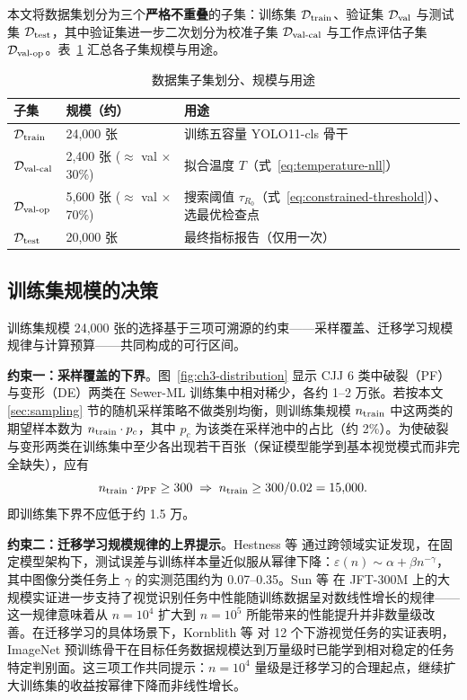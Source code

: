 \documentclass[UTF8,openany,12pt]{ctexbook}
\begin{document}
本文将数据集划分为三个\textbf{严格不重叠}的子集：训练集 $\mathcal{D}_{\rm train}$、验证集 $\mathcal{D}_{\rm val}$ 与测试集 $\mathcal{D}_{\rm test}$，其中验证集进一步二次划分为校准子集 $\mathcal{D}_{\rm val\text{-}cal}$ 与工作点评估子集 $\mathcal{D}_{\rm val\text{-}op}$。表~\ref{tab:dataset-sizes} 汇总各子集规模与用途。

\begin{table}[H]
    \centering
    \caption{数据集子集划分、规模与用途}
    \label{tab:dataset-sizes}
    \begin{tabularx}{\textwidth}{p{2.6cm}p{2.2cm}X}
        \toprule
        子集 & 规模（约） & 用途 \\
        \midrule
        $\mathcal{D}_{\rm train}$    & 24{,}000 张 & 训练五容量 YOLO11-cls 骨干 \\
        $\mathcal{D}_{\rm val\text{-}cal}$ & 2{,}400 张 ($\approx$ val $\times$ 30\%)  & 拟合温度 $T$（式~\eqref{eq:temperature-nll}）\\
        $\mathcal{D}_{\rm val\text{-}op}$  & 5{,}600 张 ($\approx$ val $\times$ 70\%)  & 搜索阈值 $\tau_{R_0}$（式~\eqref{eq:constrained-threshold}）、选最优检查点 \\
        $\mathcal{D}_{\rm test}$     & 20{,}000 张 & 最终指标报告（仅用一次） \\
        \bottomrule
    \end{tabularx}
\end{table}

\subsection{训练集规模的决策}
训练集规模 24{,}000 张的选择基于三项可溯源的约束——采样覆盖、迁移学习规模规律与计算预算——共同构成的可行区间。

\textbf{约束一：采样覆盖的下界}。图~\ref{fig:ch3-distribution} 显示 CJJ 6 类中破裂（PF）与变形（DE）两类在 Sewer-ML 训练集中相对稀少，各约 1--2 万张。若按本文 \ref{sec:sampling} 节的随机采样策略不做类别均衡，则训练集规模 $n_{\rm train}$ 中这两类的期望样本数为 $n_{\rm train} \cdot p_c$，其中 $p_c$ 为该类在采样池中的占比（约 2\%）。为使破裂与变形两类在训练集中至少各出现若干百张（保证模型能学到基本视觉模式而非完全缺失），应有
\begin{equation}
n_{\rm train} \cdot p_{\rm PF} \geq 300 \;\Rightarrow\; n_{\rm train} \geq 300 / 0.02 = 15{,}000.
\label{eq:train-lowerbound}
\end{equation}
即训练集下界不应低于约 1.5 万。

\textbf{约束二：迁移学习规模规律的上界提示}。Hestness 等\cite{hestness2017scaling} 通过跨领域实证发现，在固定模型架构下，测试误差与训练样本量近似服从幂律下降：$\varepsilon(n) \sim \alpha + \beta n^{-\gamma}$，其中图像分类任务上 $\gamma$ 的实测范围约为 0.07--0.35。Sun 等\cite{sun2017revisiting} 在 JFT-300M 上的大规模实证进一步支持了视觉识别任务中性能随训练数据呈对数线性增长的规律——这一规律意味着从 $n = 10^4$ 扩大到 $n = 10^5$ 所能带来的性能提升并非数量级改善。在迁移学习的具体场景下，Kornblith 等\cite{kornblith2019better} 对 12 个下游视觉任务的实证表明，ImageNet 预训练骨干在目标任务数据规模达到万量级时已能学到相对稳定的任务特定判别面。这三项工作共同提示：$n = 10^4$ 量级是迁移学习的合理起点，继续扩大训练集的收益按幂律下降而非线性增长。
\end{document}

